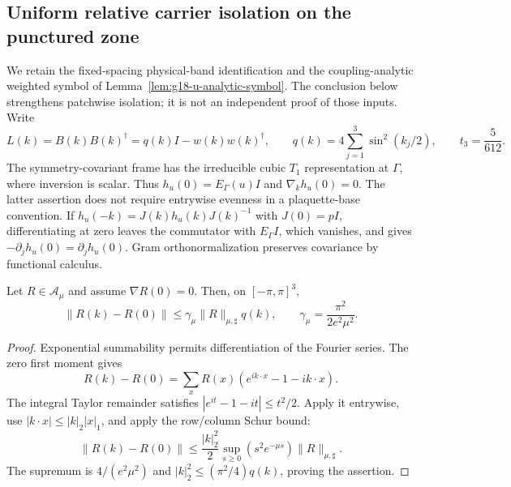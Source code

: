 \subsection{Uniform relative carrier isolation on the punctured zone}
\label{sec:g18-relative-gap-bridge}

We retain the fixed-spacing physical-band identification and the
coupling-analytic weighted symbol of Lemma~\ref{lem:g18-u-analytic-symbol}.
The conclusion below strengthens patchwise isolation; it is not an
independent proof of those inputs. Write
\[
 L(k)=B(k)B(k)^\dagger=q(k)I-w(k)w(k)^\dagger,\qquad
 q(k)=4\sum_{j=1}^3\sin^2(k_j/2),\qquad t_3=\frac5{612}.
\]
The symmetry-covariant frame has the irreducible cubic $T_1$ representation
at $\Gamma$, where inversion is scalar. Thus
$h_u(0)=E_\Gamma(u)I$ and $\nabla_kh_u(0)=0$.
The latter assertion does not require entrywise evenness in a
plaquette-base convention. If
$h_u(-k)=J(k)h_u(k)J(k)^{-1}$ with $J(0)=pI$, differentiating at zero
leaves the commutator with $E_\Gamma I$, which vanishes, and gives
$-\partial_jh_u(0)=\partial_jh_u(0)$.
Gram orthonormalization preserves covariance by functional calculus.

\begin{lemma}
\label{lem:g18-weighted-centering}
Let $R\in\mathcal A_\mu$ and assume $\nabla R(0)=0$. Then, on
$[-\pi,\pi]^3$,
\[
 \|R(k)-R(0)\|\le\gamma_\mu\|R\|_{\mu,\sharp}q(k),\qquad
 \gamma_\mu=\frac{\pi^2}{2e^2\mu^2}.
\]
\end{lemma}
\begin{proof}
Exponential summability permits differentiation of the Fourier series.
The zero first moment gives
\[
 R(k)-R(0)=\sum_xR(x)(e^{ik\cdot x}-1-ik\cdot x).
\]
The integral Taylor remainder satisfies
$|e^{it}-1-it|\le t^2/2$. Apply it entrywise, use
$|k\cdot x|\le |k|_2|x|_1$, and apply the row/column Schur bound:
\[
 \|R(k)-R(0)\|\le\frac{|k|_2^2}{2}
 \sup_{s\ge0}(s^2e^{-\mu s})\|R\|_{\mu,\sharp}.
\]
The supremum is $4/(e^2\mu^2)$ and
$|k|_2^2\le(\pi^2/4)q(k)$, proving the assertion.
\end{proof}

